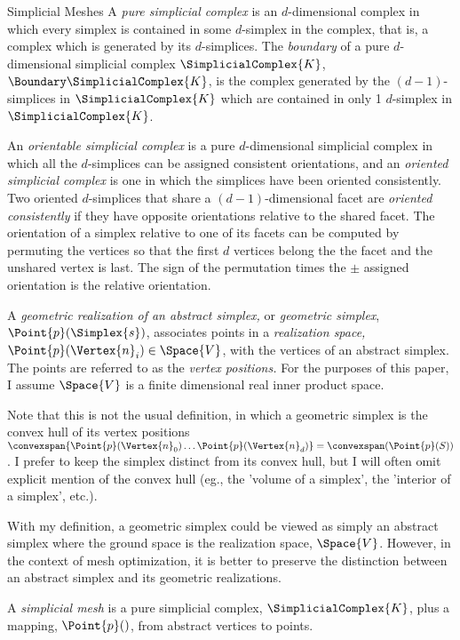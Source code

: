 \begin{plSection}{Simplicial Meshes}
A {\it pure simplicial complex} is an $d$-dimensional complex
in which every simplex is contained in some $d$-simplex in the complex,
that is, a complex which is generated by its $d$-simplices.
The {\it boundary} of a pure $d$-dimensional simplicial complex $\SimplicialComplex{K}$,
$\Boundary \SimplicialComplex{K}$,
is the complex generated by the $(d-1)$-simplices in $\SimplicialComplex{K}$
which are contained in only 1 $d$-simplex in $\SimplicialComplex{K}$.

An {\it orientable simplicial complex} is a pure $d$-dimensional simplicial complex
in which all the $d$-simplices can be assigned consistent orientations,
and an {\it oriented simplicial complex} is one in which the simplices
have been oriented consistently.
Two oriented $d$-simplices that share a $(d-1)$-dimensional facet
are {\it oriented consistently} if they have opposite orientations
relative to the shared facet. The orientation of a simplex relative to
one of its facets can be computed by permuting the vertices so that
the first $d$ vertices belong the the facet and the unshared vertex is last.
The sign of the permutation times the $\pm$ assigned orientation
is the relative orientation.

A {\it geometric realization of an abstract simplex,}
or {\it geometric simplex}, $\Point{p}(\Simplex{s})$,  associates points
in a {\it realization space,}
$\Point{p} ( \Vertex{n}_i ) \in \Space{V}$, with the vertices of an abstract simplex.
The points are referred to as the {\it vertex positions.}
For the purposes of this paper,
I assume $\Space{V}$ is
a finite dimensional real inner product space.

Note that this is not the usual definition,
in which a geometric simplex is the convex hull of its vertex positions
$\convexspan \{ \Point{p}(\Vertex{n}_0) \ldots \Point{p}(\Vertex{n}_d) \} 
= \convexspan ( \Point{p}(S) )$.
I prefer to keep the simplex distinct from its convex hull,
but I will often omit explicit mention of the convex hull
(eg., the 'volume of a simplex', the 'interior of a simplex', etc.).

With my definition,
a geometric simplex could be viewed as simply an abstract simplex
where the ground space is the realization space, $\Space{V}$.
However, in the context of mesh optimization,
it is better to preserve the distinction between an abstract simplex
and its geometric realizations.

A {\it simplicial mesh} is a pure simplicial complex, $\SimplicialComplex{K}$,
plus a mapping, $\Point{p}()$, from abstract vertices to points.


\end{plSection}
